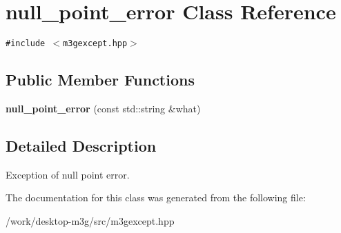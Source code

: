 \hypertarget{classm3g_1_1null__point__error}{
\section{null\_\-point\_\-error Class Reference}
\label{classm3g_1_1null__point__error}
}
{\tt \#include $<$m3gexcept.hpp$>$}

\subsection*{Public Member Functions}
\begin{CompactItemize}
\item 
\hypertarget{classm3g_1_1null__point__error_69fa4667be16b17cab9037f573a9ff59}{
\textbf{null\_\-point\_\-error} (const std::string \&what)}
\label{classm3g_1_1null__point__error_69fa4667be16b17cab9037f573a9ff59}

\end{CompactItemize}


\subsection{Detailed Description}
Exception of null point error. 

The documentation for this class was generated from the following file:\begin{CompactItemize}
\item 
/work/desktop-m3g/src/m3gexcept.hpp\end{CompactItemize}

